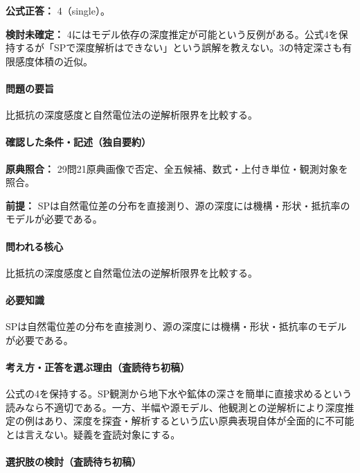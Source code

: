 \textbf{公式正答：} 4（single）。

\par\textbf{検討未確定：} 4にはモデル依存の深度推定が可能という反例がある。公式4を保持するが「SPで深度解析はできない」という誤解を教えない。3の特定深さも有限感度体積の近似。

\paragraph{問題の要旨} 比抵抗の深度感度と自然電位法の逆解析限界を比較する。

\paragraph{確認した条件・記述（独自要約）}\mbox{}\par

\noindent\textbf{原典照合：} 29問21原典画像で否定、全五候補、数式・上付き単位・観測対象を照合。\par

\noindent\textbf{前提：} SPは自然電位差の分布を直接測り、源の深度には機構・形状・抵抗率のモデルが必要である。\par

\paragraph{問われる核心} 比抵抗の深度感度と自然電位法の逆解析限界を比較する。

\paragraph{必要知識} SPは自然電位差の分布を直接測り、源の深度には機構・形状・抵抗率のモデルが必要である。

\paragraph{考え方・正答を選ぶ理由（査読待ち初稿）} 公式の4を保持する。SP観測から地下水や鉱体の深さを簡単に直接求めるという読みなら不適切である。一方、半幅や源モデル、他観測との逆解析により深度推定の例はあり、深度を探査・解析するという広い原典表現自体が全面的に不可能とは言えない。疑義を査読対象にする。

\paragraph{選択肢の検討（査読待ち初稿）}\mbox{}\par

